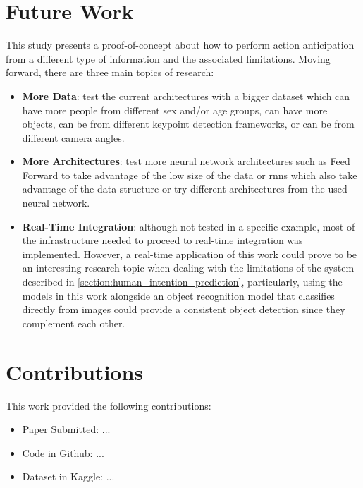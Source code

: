 \section{Future Work}

This study presents a proof-of-concept about how to perform action anticipation from a different type of information and the associated limitations. Moving forward, there are three main topics of research:

\begin{itemize}
    \item \textbf{More Data}: test the current architectures with a bigger dataset which can have more people from different sex and/or age groups, can have more objects, can be from different keypoint detection frameworks, or can be from different camera angles.
    \item \textbf{More Architectures}: test more neural network architectures such as Feed Forward to take advantage of the low size of the data or \acs{rnn}s which also take advantage of the data structure or try different architectures from the used neural network.
    \item \textbf{Real-Time Integration}: although not tested in a specific example, most of the infrastructure needed to proceed to real-time integration was implemented. However, a real-time application of this work could prove to be an interesting research topic when dealing with the limitations of the system described in \autoref{section:human_intention_prediction}, particularly, using the models in this work alongside an object recognition model that classifies directly from images could provide a consistent object detection since they complement each other.
\end{itemize}

\section{Contributions}

This work provided the following contributions:

\begin{itemize}
    \item Paper Submitted: ...
    \item Code in Github: ...
    \item Dataset in Kaggle: ...
\end{itemize}
\fi
